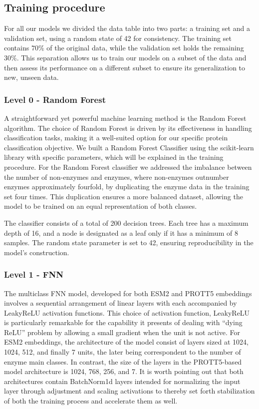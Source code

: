 \documentclass{bioinfo}
\begin{document}
\begin{methods}
\subsection{Training procedure}
For all our models we divided the data table into two parts: a training set and a validation set, using a random state of 42 for consistency. 
The training set contains $70\%$ of the original data, while the validation set holds the remaining $30\%$. 
This separation allows us to train our models on a subset of the data and then assess its performance on a different subset to ensure its generalization to new, unseen data.

\subsubsection{Level 0 - Random Forest}
A straightforward yet powerful machine learning method is the Random Forest algorithm.
The choice of Random Forest is driven by its effectiveness in handling classification tasks, making it a well-suited option for our specific protein classification objective.
We built a Random Forest Classifier using the scikit-learn library with specific parameters, which will be explained in the training procedure. 
For the Random Forest classifier we addressed the imbalance between the number of non-enzymes and enzymes, where non-enzymes outnumber enzymes approximately fourfold,
by duplicating the enzyme data in the training set four times.
This duplication ensures a more balanced dataset, allowing the model to be trained on an equal representation of both classes.

The classifier consists of a total of 200 decision trees.
Each tree has a maximum depth of 16, and a node is designated as a leaf only if it has a minimum of 8 samples.
The random state parameter is set to 42, ensuring reproducibility in the model's construction.
\subsubsection{Level 1 - FNN}
The multiclass FNN model, developed for both ESM2 and PROTT5 embeddings involves a sequential arrangement of linear layers with each accompanied by LeakyReLU activation functions.
This choice of activation function, LeakyReLU is particularly remarkable for the capability it presents of dealing with “dying ReLU”%
problem by allowing a small gradient when the unit is not active. 
For ESM2 embeddings, the architecture of the model consist of layers sized at 1024, 1024, 512, and finally 7 units, the later being correspondent 
to the number of enzyme main classes. In contrast, the size of the layers in the PROTT5-based model architecture is 1024, 768, 256, and 7.
It is worth pointing out that both architectures contain BatchNorm1d layers intended for normalizing the input layer through adjustment
and scaling activations to thereby set 
forth stabilization of both the training process and accelerate them as well.


\end{methods}
\end{document}
